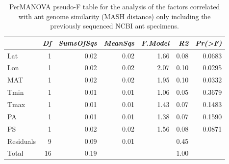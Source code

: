 \begin{table}[ht]
\centering
\begin{tabular}{lrrrrrr}
  \hline
 & {\emph{Df}} & {\emph{SumsOfSqs}} & {\emph{MeanSqs}} & {\emph{F.Model}} & {\emph{R2}} & {\emph{Pr(>F)}} \\ 
  \hline
Lat & 1 & 0.02 & 0.02 & 1.66 & 0.08 & 0.0683 \\ 
  Lon & 1 & 0.02 & 0.02 & 2.07 & 0.10 & 0.0295 \\ 
  MAT & 1 & 0.02 & 0.02 & 1.95 & 0.10 & 0.0332 \\ 
  Tmin & 1 & 0.01 & 0.01 & 1.06 & 0.05 & 0.3679 \\ 
  Tmax & 1 & 0.01 & 0.01 & 1.43 & 0.07 & 0.1483 \\ 
  PA & 1 & 0.01 & 0.01 & 1.38 & 0.07 & 0.1590 \\ 
  PS & 1 & 0.02 & 0.02 & 1.56 & 0.08 & 0.0871 \\ 
  Residuals & 9 & 0.09 & 0.01 &  & 0.45 &  \\ 
  Total & 16 & 0.19 &  &  & 1.00 &  \\ 
   \hline
\end{tabular}
\caption{PerMANOVA pseudo-F table for the analysis of the factors 
correlated with ant genome similarity (MASH distance) only including the 
previously sequenced NCBI ant specimens.} 
\label{tab:ad_mash_napg}
\end{table}
